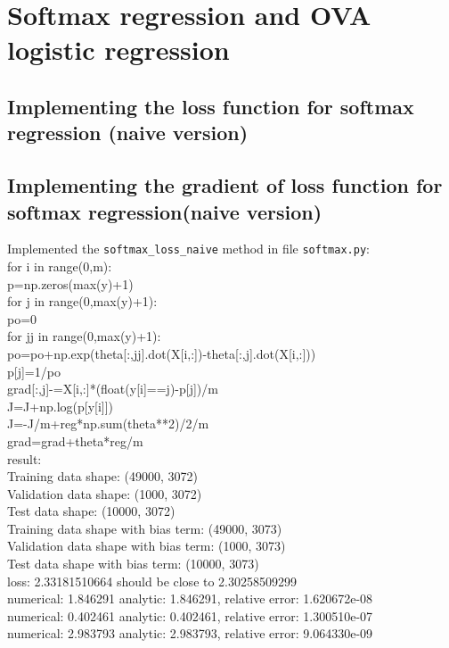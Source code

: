 \documentclass{article}
\begin{document}
\section{Softmax regression and OVA logistic regression}
\subsection{Implementing the loss function for softmax regression (naive version)}
\subsection{Implementing the gradient of loss function for softmax regression(naive version)}
Implemented the \verb|softmax_loss_naive| method in file \verb|softmax.py|:\\[10pt]
for i in range(0,m):\\
    p=np.zeros(max(y)+1)\\
    for j in range(0,max(y)+1):\\
	po=0\\
	for jj in range(0,max(y)+1):\\
		po=po+np.exp(theta[:,jj].dot(X[i,:])-theta[:,j].dot(X[i,:]))\\
	p[j]=1/po\\
    	grad[:,j]-=X[i,:]*(float(y[i]==j)-p[j])/m\\
    J=J+np.log(p[y[i]])\\
  J=-J/m+reg*np.sum(theta**2)/2/m\\
  grad=grad+theta*reg/m\\[10pt]
result:\\[10pt]
Training data shape:  (49000, 3072)\\
Validation data shape:  (1000, 3072)\\
Test data shape:  (10000, 3072)\\
Training data shape with bias term:  (49000, 3073)\\
Validation data shape with bias term:  (1000, 3073)\\
Test data shape with bias term:  (10000, 3073)\\
loss: 2.33181510664  should be close to  2.30258509299\\
numerical: 1.846291 analytic: 1.846291, relative error: 1.620672e-08\\
numerical: 0.402461 analytic: 0.402461, relative error: 1.300510e-07\\
numerical: 2.983793 analytic: 2.983793, relative error: 9.064330e-09\\
\end{document}
